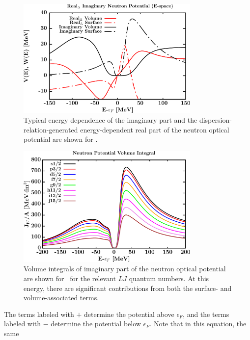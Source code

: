 \begin{figure}[tb]
    \centering
    \includegraphics[width=0.8\textwidth]{figures/EnergyDependence.png}
    \caption[Energy-dependent forms of the imaginary and real-dispersive parts of the potential]
    {
        Typical energy dependence of the imaginary part and the
        dispersion-relation-generated energy-dependent real part of the
        neutron optical potential are shown for \caForty.
    }
    \label{EnergyDependence}
\end{figure}
\begin{figure}[tb]
    \centering
    \includegraphics[width=0.8\textwidth]{figures/VolumeIntegral.png}
    \caption[Volume integral of the imaginary part of the potential]
    {
        Volume integrals of imaginary part of the
        neutron optical potential are shown for \caForty\ for the relevant $LJ$
        quantum numbers. At this energy, there are
        significant contributions from both the surface- and volume-associated
        terms.
    }
    \label{VolumeIntegral}
\end{figure}
The terms labeled with $+$ determine the potential above $\epsilon_{F}$, and the terms labeled
with $-$ determine the potential below $\epsilon_{F}$. Note that in this equation, the same

